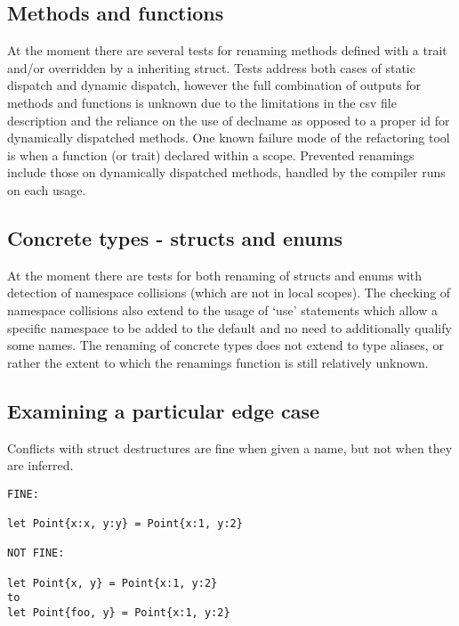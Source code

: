 
\subsection{Methods and functions}
At the moment there are several tests for renaming methods defined with a trait and/or overridden by a inheriting struct. Tests address both cases of static dispatch and dynamic dispatch, however the full combination of outputs for methods and functions is unknown due to the limitations in the csv file description and the reliance on the use of declname as opposed to a proper id for dynamically dispatched methods. One known failure mode of the refactoring tool is when a function (or trait) declared within a scope. Prevented renamings include those on dynamically dispatched methods, handled by the compiler runs on each usage.

\subsection{Concrete types - structs and enums}
At the moment there are tests for both renaming of structs and enums with detection of namespace collisions (which are not in local scopes). The checking of namespace collisions also extend to the usage of `use' statements which allow a specific namespace to be added to the default and no need to additionally qualify some names. The renaming of concrete types does not extend to type aliases, or rather the extent to which the renamings function is still relatively unknown.



\subsection{Examining a particular edge case}

Conflicts with struct destructures are fine when given a name, but not when they are inferred.
\begin{verbatim}
FINE:

let Point{x:x, y:y} = Point{x:1, y:2}

NOT FINE:

let Point{x, y} = Point{x:1, y:2}
to 
let Point{foo, y} = Point{x:1, y:2}
\end{verbatim}



